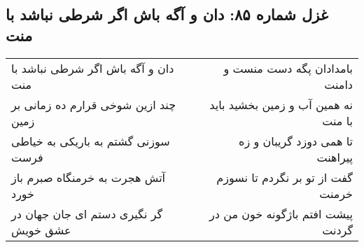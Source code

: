 \begin{center}
\section*{غزل شماره ۸۵: دان و آگه باش اگر شرطی نباشد با منت}
\label{sec:085}
\begin{longtable}{l p{0.5cm} r}
دان و آگه باش اگر شرطی نباشد با منت
&&
بامدادان پگه دست منست و دامنت
\\
چند ازین شوخی قرارم ده زمانی بر زمین
&&
نه همین آب و زمین بخشید باید با منت
\\
سوزنی گشتم به باریکی به خیاطی فرست
&&
تا همی دوزد گریبان و زه پیراهنت
\\
آتش هجرت به خرمنگاه صبرم باز خورد
&&
گفت از تو بر نگردم تا نسوزم خرمنت
\\
گر نگیری دستم ای جان جهان در عشق خویش
&&
پیشت افتم باژگونه خون من در گردنت
\\
\end{longtable}
\end{center}
